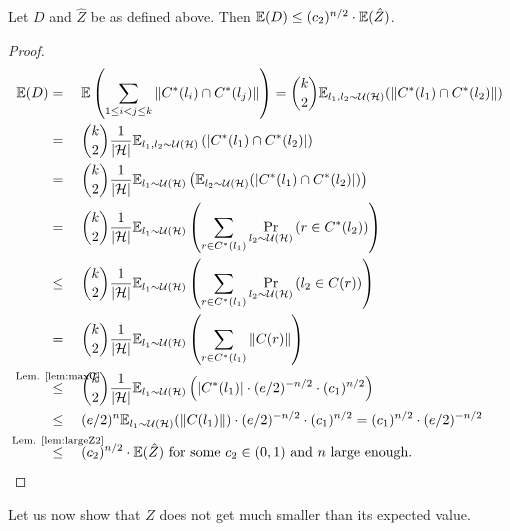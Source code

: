 \documentclass[a4paper,USenglish,cleveref]{lipics-v2021}
\def\refRelLem#1#2{\stackrel{\mathclap{\text{Lem. \ref{#1}}}}{#2}\quad}
\begin{document}
\begin{lemma}
  Let $D$ and $\hat Z$ be as defined above.
  Then $\mathbb{E}(D) \leq (c_2)^{n/2} \cdot \mathbb{E}(\hat Z)$.
  \label{lem:smallD}
\end{lemma}
\begin{proof}
  \begin{align*}
    \expect(D)
      &= \quad\expect\left(\sum_{1 \leq i < j \leq k} \|C^*(l_i) \cap C^*(l_j)\|\right)
       = {k \choose 2} \expect_{l_1,l_2 \sim \uniform(\H)}( \| C^*(l_1) \cap C^*(l_2) \| )\\
      &= \quad{k \choose 2} \frac{1}{|\H|} \expect_{l_1,l_2 \sim \uniform(\H)}\left( | C^*(l_1) \cap C^*(l_2) | \right)\\
      &= \quad{k \choose 2} \frac{1}{|\H|} \expect_{l_1 \sim \uniform(\H)}\left(\expect_{l_2 \sim \uniform(\H)}( | C^*(l_1) \cap C^*(l_2) | )\right)\\
      &= \quad{k \choose 2} \frac{1}{|\H|} \expect_{l_1 \sim \uniform(\H)}\left(\sum_{r \in C^*(l_1)}\Pr_{l_2 \sim \uniform(\H)}\left(r \in C^*(l_2)\right) \right)\\
      &\leq \quad{k \choose 2} \frac{1}{|\H|} \expect_{l_1 \sim \uniform(\H)}\left(\sum_{r \in C^*(l_1)}\Pr_{l_2 \sim \uniform(\H)}\left(l_2 \in C(r)\right) \right)\\
      &= \quad{k \choose 2} \frac{1}{|\H|} \expect_{l_1 \sim \uniform(\H)}\left(\sum_{r \in C^*(l_1)} \|C(r)\| \right)\\
      &\refRelLem{lem:maxC}{\leq} {k \choose 2} \frac{1}{|\H|} \expect_{l_1 \sim \uniform(\H)}\left(|C^*(l_1)| \cdot (e/2)^{-n/2} \cdot (\constantMaxC)^{n/2} \right)\\
      &\leq \quad(e/2)^{n} \expect_{l_1 \sim \uniform(\H)}(\|C(l_1)\|) \cdot (e/2)^{-n/2} \cdot (\constantMaxC)^{n/2}
      = (\constantMaxC)^{n/2} \cdot (e/2)^{-n/2}\\
      &\refRelLem{lem:largeZ2}{\leq} (\constantD)^{n/2} \cdot \expect(\hat Z) \textrm{ for some $\constantD \in (0, 1)$ and $n$ large enough.}
    \tag*{\qedhere}
  \end{align*}
\end{proof}

Let us now show that $\hat Z$ does not get much smaller than its expected value.
\end{document}
